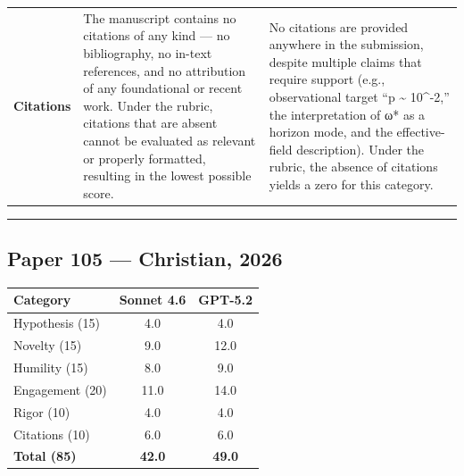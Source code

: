 \documentclass[11pt]{article}
\begin{document}
\begin{longtable}{@{} p{2.2cm} p{6.3cm} p{6.3cm} @{}}
\textbf{Citations} &
The manuscript contains no citations of any kind — no bibliography, no in-text references, and no attribution of any foundational or recent work. Under the rubric, citations that are absent cannot be evaluated as relevant or properly formatted, resulting in the lowest possible score. &
No citations are provided anywhere in the submission, despite multiple claims that require support (e.g., observational target “p \textasciitilde{} 10\textasciicircum{}-2,” the interpretation of ω* as a horizon mode, and the effective-field description). Under the rubric, the absence of citations yields a zero for this category. \\

\end{longtable}

\bigskip
\hrule
\bigskip

\subsection*{Paper 105 --- Christian, 2026}

\medskip

\begin{tabular}{lcc}
\toprule
\textbf{Category} & \textbf{Sonnet 4.6} & \textbf{GPT-5.2} \\
\midrule
Hypothesis (15) & 4.0 & 4.0 \\
Novelty (15) & 9.0 & 12.0 \\
Humility (15) & 8.0 & 9.0 \\
Engagement (20) & 11.0 & 14.0 \\
Rigor (10) & 4.0 & 4.0 \\
Citations (10) & 6.0 & 6.0 \\
\midrule
\textbf{Total (85)} & \textbf{42.0} & \textbf{49.0} \\
\bottomrule
\end{tabular}

\bigskip
\end{document}
